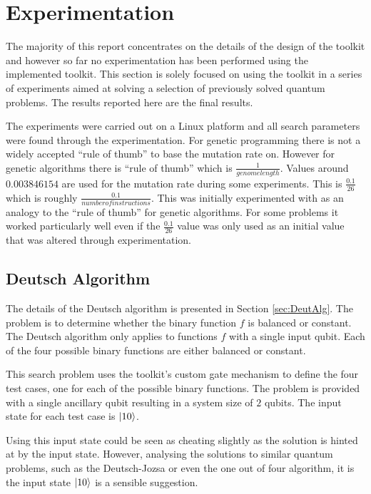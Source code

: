 \chapter{Experimentation}
\label{sec:experimentation}

The majority of this report concentrates on the details of the design of the toolkit and however so far no experimentation has been performed using the implemented toolkit.
This section is solely focused on using the toolkit in a series of experiments aimed at solving a selection of previously solved quantum problems.
The results reported here are the final results.

The experiments were carried out on a Linux platform and all search parameters were found through the experimentation.
For genetic programming there is not a widely accepted ``rule of thumb'' to base the mutation rate on.
However for genetic algorithms there is ``rule of thumb'' which is $\frac{1}{genome length}$\cite{Ochoa}.
Values around $0.003846154$ are used for the mutation rate during some experiments.
This is $\frac{0.1}{26}$ which is roughly $\frac{0.1}{number of instructions}$.
This was initially experimented with as an analogy to the ``rule of thumb'' for genetic algorithms.
For some problems it worked particularly well even if the $\frac{0.1}{26}$ value was only used as an initial value that was altered through experimentation.

\section{Deutsch Algorithm}
\label{sec:deutschexperiment}
The details of the Deutsch algorithm is presented in Section \ref{sec:DeutAlg}.
The problem is to determine whether the binary function $f$ is balanced or constant.
The Deutsch algorithm only applies to functions $f$ with a single input qubit.
Each of the four possible binary functions are either balanced or constant.

This search problem uses the toolkit's custom gate mechanism to define the four test cases, one for each of the possible binary functions.
The problem is provided with a single ancillary qubit resulting in a system size of $2$ qubits.
The input state for each test case is $\left\vert{10}\right\rangle$.

Using this input state could be seen as cheating slightly as the solution is hinted at by the input state.
However, analysing the solutions to similar quantum problems, such as the Deutsch-Jozsa or even the one out of four algorithm, it is the input state $\left\vert{10}\right\rangle$ is a sensible suggestion.

